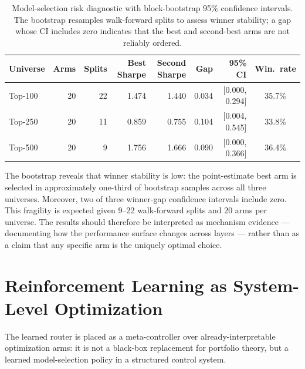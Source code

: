 \documentclass[journal,10pt]{IEEEtran}
\begin{document}
\begin{table}[!t]
\centering
\caption{Model-selection risk diagnostic with block-bootstrap 95\% confidence intervals. The bootstrap resamples walk-forward splits to assess winner stability; a gap whose CI includes zero indicates that the best and second-best arms are not reliably ordered.}
\label{tab:selection_risk_math}
\small
\begin{tabular}{lrrrrrrc}
\toprule
Universe & Arms & Splits & Best Sharpe & Second Sharpe & Gap & 95\% CI & Win.\ rate\\
\midrule
Top-100 & 20 & 22 & 1.474 & 1.440 & 0.034 & [0.000, 0.294] & 35.7\%\\
Top-250 & 20 & 11 & 0.859 & 0.755 & 0.104 & [0.004, 0.545] & 33.8\%\\
Top-500 & 20 & 9 & 1.756 & 1.666 & 0.090 & [0.000, 0.366] & 36.4\%\\
\bottomrule
\end{tabular}
\end{table}
The bootstrap reveals that winner stability is low: the point-estimate best arm is selected in approximately one-third of bootstrap samples across all three universes. Moreover, two of three winner-gap confidence intervals include zero. This fragility is expected given 9--22 walk-forward splits and 20 arms per universe. The results should therefore be interpreted as mechanism evidence — documenting how the performance surface changes across layers — rather than as a claim that any specific arm is the uniquely optimal choice.

\section{Reinforcement Learning as System-Level Optimization}
The learned router is placed as a meta-controller over already-interpretable optimization arms: it is not a black-box replacement for portfolio theory, but a learned model-selection policy in a structured control system.
\end{document}
